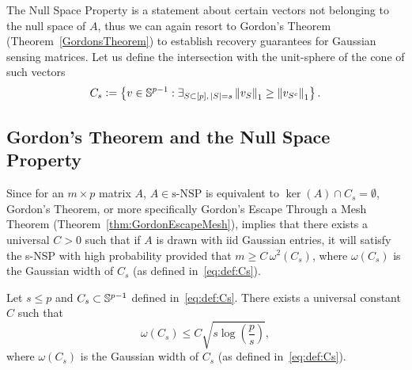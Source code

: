 The Null Space Property is a statement about certain vectors not belonging to the null space of $A$, thus we can again resort to Gordon's Theorem  (Theorem~\ref{GordonsTheorem}) to establish recovery guarantees for Gaussian sensing matrices. Let us define the intersection with the unit-sphere of the cone of such vectors
\begin{equation}\label{eq:def:Cs}
C_s \mathrel{\mathop:}= \left\{v\in\mathbb{S}^{p-1}: \exists_{S\subset [p],\, |S|=s} \left\|v_S\right\|_1\geq \left\|v_{S^c}\right\|_1 \right\}.
\end{equation} 

\subsection{Gordon's Theorem and the Null Space Property}\label{ss:gordonnullspace}

Since for an $m\times p$ matrix $A$, $A\in\text{s-NSP}$ is equivalent to $\ker(A) \cap C_s = \emptyset $, Gordon's Theorem, or more specifically Gordon's Escape Through a Mesh Theorem (Theorem~\ref{thm:GordonEscapeMesh}), implies that there exists a universal $C>0$ such that if $A$ is drawn with iid Gaussian entries, it will satisfy the s-NSP with high probability provided that $m \geq C\, \omega^2\left( C_s \right)$, where $ \omega\left( C_s \right)$ is the Gaussian width of $C_s$ (as defined in~\eqref{eq:def:Cs}).

\begin{proposition}
Let $s\leq p$ and $C_s\subset \mathbb{S}^{p-1}$ defined in~\eqref{eq:def:Cs}. There exists a universal constant $C$ such that
\[
\omega\left( C_s \right) \leq C \sqrt{s \log\left( \frac{p}s \right)},
\]
where $ \omega\left( C_s \right)$ is the Gaussian width of $C_s$ (as defined in~\eqref{eq:def:Cs}).
\end{proposition}

